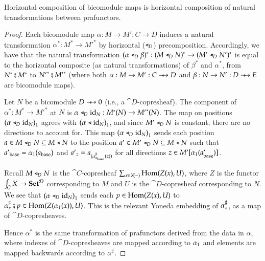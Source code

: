 \documentclass{amsart}
\begin{document}
\begin{prop}
  Horizontal composition of bicomodule maps is horizontal composition
  of natural transformations between prafunctors.
\end{prop}
\begin{proof}
  Each bicomodule map $\alpha: M \to M': C \to D$ induces a natural
  transformation $\alpha^*:M^* \to {M'}^*$ by horizontal ($\mathrel{\triangleleft}_D$)
  precomposition. Accordingly, we have that the natural transformation
  $(\alpha \mathrel{\triangleleft}_D \beta)^*: (M \mathrel{\triangleleft}_D N)^* \to (M' \mathrel{\triangleleft}_D N')^*$ is
  equal to the horizontal composite (as natural transformations) of
  $\beta^*$ and $\alpha^*$, from $N^* \fatsemi M^*$ to
  ${N'}^* \fatsemi {M'}^*$ (where both $\alpha: M \to M': C \bim D$
  and $\beta: N \to N': D \bim E$ are bicomodule maps).

  Let $N$ be a bicomodule $D \bim 0$ (i.e., a
  $\cat{D}$-copresheaf). The component of $\alpha^*: M^* \to {M'}^*$
  at $N$ is $\alpha \mathrel{\triangleleft}_D \mathrm{id}_N: M^*(N) \to {M'}^*(N)$. The map on
  positions ${(\alpha \mathrel{\triangleleft}_D \mathrm{id}_N)}_1$ agrees with
  ${(\alpha \mathrel{\triangleleft} \mathrm{id}_N)}_1$, and since $M' \mathrel{\triangleleft}_D N$ is constant,
  there are no directions to account for. This map
  ${(\alpha \mathrel{\triangleleft}_D \mathrm{id}_N)}_1$ sends each position
  ${a \in M \mathrel{\triangleleft}_D N \subseteq M \mathrel{\triangleleft} N}$ to the position
  ${a' \in M' \mathrel{\triangleleft}_D N \subseteq M \mathrel{\triangleleft} N}$ such that
  ${a'}_{\mathrm{base}} = {\alpha}_1(a_{\mathrm{base}})$ and
  ${{a'}_z = a_{({\alpha}^\sharp_{a_{\mathrm{base}}}(z))}}$ for all directions
  $z \in M'[{\alpha}_1(a'_{\mathrm{base}})]$.

  Recall $M \mathrel{\triangleleft}_D N$ is the $\cat{C}$-copresheaf
  $\sum_{x \in X\!(-)} \operatorname{Hom}(Z(x),U)$, where $Z$ is the functor
  $\int_{\mathcal{C}}X \to {\normalfont\mathbf{Set}}^{\mathcal{D}}$ corresponding to $M$ and $U$ is
  the $\cat{D}$-copresheaf corresponding to $N$. We see that
  ${(\alpha \mathrel{\triangleleft}_D \mathrm{id}_N)}_1$ sends each ${p \in \operatorname{Hom}(Z(x),U)}$
  to
  ${\alpha}^\sharp_{x} \fatsemi {p \in
    \operatorname{Hom}(Z({\alpha}_1(x)),U)}$. This is the relevant Yoneda
  embedding of ${\alpha}^\sharp_{x}$, as a map of
  $\cat{D}$-copresheaves.

  Hence $\alpha^*$ is the same transformation of prafunctors derived
  from the data in $\alpha$, where indexes of $\cat{D}$-copresheaves
  are mapped according to ${\alpha}_1$ and elements are mapped
  backwards according to ${\alpha}^\sharp$.
\end{proof}
\end{document}
